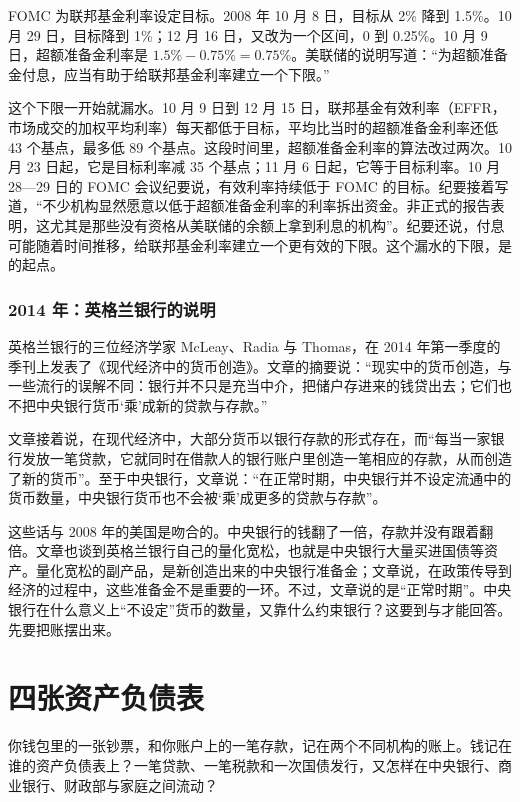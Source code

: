 FOMC 为联邦基金利率设定目标。2008 年 10 月 8 日，目标从 2\% 降到 1.5\%。10 月 29 日，目标降到 1\%；12 月 16 日，又改为一个区间，0 到 0.25\%\cite{fred2026m}。10 月 9 日，超额准备金利率是 $1.5\%-0.75\%=0.75\%$。美联储的说明写道：“为超额准备金付息，应当有助于给联邦基金利率建立一个下限。”\cite{fed2008ior}

这个下限一开始就漏水。10 月 9 日到 12 月 15 日，联邦基金有效利率（EFFR，市场成交的加权平均利率）每天都低于目标，平均比当时的超额准备金利率还低 43 个基点，最多低 89 个基点。这段时间里，超额准备金利率的算法改过两次。10 月 23 日起，它是目标利率减 35 个基点；11 月 6 日起，它等于目标利率\cite{fred2026m}。10 月 28—29 日的 FOMC 会议纪要说，有效利率持续低于 FOMC 的目标。纪要接着写道，“不少机构显然愿意以低于超额准备金利率的利率拆出资金。非正式的报告表明，这尤其是那些没有资格从美联储的余额上拿到利息的机构”。纪要还说，付息可能随着时间推移，给联邦基金利率建立一个更有效的下限\cite{fomc2008min}。这个漏水的下限，是的起点。

\subsubsection{2014 年：英格兰银行的说明}
英格兰银行的三位经济学家 McLeay、Radia 与 Thomas，在 2014 年第一季度的季刊上发表了《现代经济中的货币创造》。文章的摘要说：“现实中的货币创造，与一些流行的误解不同：银行并不只是充当中介，把储户存进来的钱贷出去；它们也不把中央银行货币‘乘’成新的贷款与存款。”\cite{mcleay2014}

文章接着说，在现代经济中，大部分货币以银行存款的形式存在，而“每当一家银行发放一笔贷款，它就同时在借款人的银行账户里创造一笔相应的存款，从而创造了新的货币”。至于中央银行，文章说：“在正常时期，中央银行并不设定流通中的货币数量，中央银行货币也不会被‘乘’成更多的贷款与存款”\cite{mcleay2014}。

这些话与 2008 年的美国是吻合的。中央银行的钱翻了一倍，存款并没有跟着翻倍。文章也谈到英格兰银行自己的量化宽松，也就是中央银行大量买进国债等资产。量化宽松的副产品，是新创造出来的中央银行准备金；文章说，在政策传导到经济的过程中，这些准备金不是重要的一环\cite{mcleay2014}。不过，文章说的是“正常时期”。中央银行在什么意义上“不设定”货币的数量，又靠什么约束银行？这要到与才能回答。先要把账摆出来。

\section{四张资产负债表}\label{sec:money-sheets}

你钱包里的一张钞票，和你账户上的一笔存款，记在两个不同机构的账上。钱记在谁的资产负债表上？一笔贷款、一笔税款和一次国债发行，又怎样在中央银行、商业银行、财政部与家庭之间流动？

